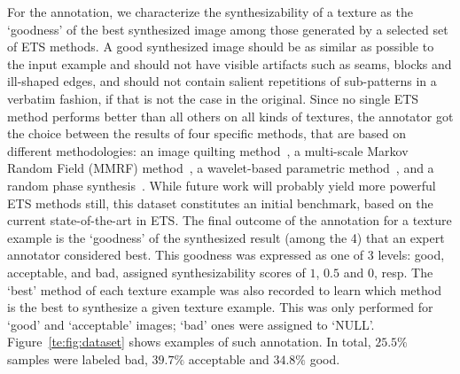 For the annotation, we characterize the synthesizability of a texture
as the `goodness' of the best synthesized image among those generated
by a selected set of ETS methods. A good synthesized image should be
as similar as possible to the input example and should not have
visible artifacts such as seams, blocks and ill-shaped edges, and
should not contain salient repetitions of sub-patterns in a verbatim
fashion, if that is not the case in the original. Since no single ETS
method performs better than all others on all kinds of textures, the
annotator got the choice between the results of four specific methods,
that are based on different methodologies: an image quilting
method~\citep{Efros:sig2001}, a multi-scale Markov Random Field (MMRF)
method~\citep{Zalesny05}, a wavelet-based parametric
method~\citep{Portilla:2000:IJCV}, and a random phase
synthesis~\citep{random:phase}. While future work will probably yield
more powerful ETS methods still, this dataset constitutes an initial
benchmark, based on the current state-of-the-art in ETS. The final
outcome of the annotation for a texture example is the `goodness' of
the synthesized result (among the 4) that an expert annotator
considered best. This goodness was expressed as one of 3 levels: good,
acceptable, and bad, assigned synthesizability scores of $1$, $0.5$
and $0$, resp. The `best' method of each texture example was also
recorded to learn which method is the best to synthesize a given
texture example. This was only performed for `good' and `acceptable'
images; `bad' ones were assigned to `NULL'.  Figure~\ref{te:fig:dataset}
shows examples of such annotation. In total, $25.5\%$ samples were
labeled bad, $39.7\%$ acceptable and $34.8\%$ good.


